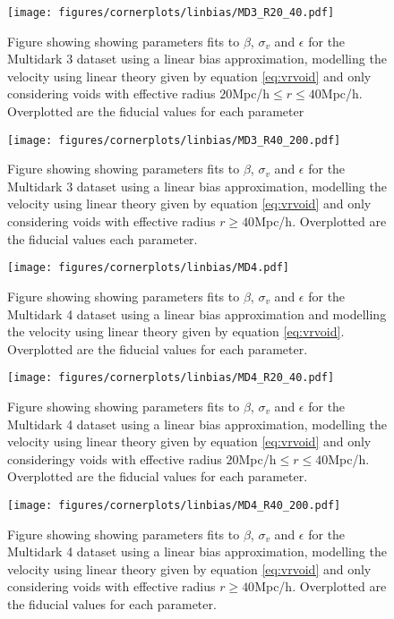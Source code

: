 \begin{figure}[H]
    \texttt{[image: figures/cornerplots/linbias/MD3\_R20\_40.pdf]}
    \caption{Figure showing showing parameters fits to $\beta$, $\sigma_v$ and $\epsilon$ for the Multidark 3 dataset using a linear bias approximation, modelling the velocity using linear theory given by equation \ref{eq:vrvoid} and only considering voids with effective radius $20$Mpc/h$\leq r \leq 40$Mpc/h. Overplotted are the fiducial values for each parameter}
    \label{fig:linbiasMD3R2040}
\end{figure}

\begin{figure}[H]
    \texttt{[image: figures/cornerplots/linbias/MD3\_R40\_200.pdf]}
    \caption{Figure showing showing parameters fits to $\beta$, $\sigma_v$ and $\epsilon$ for the Multidark 3 dataset using a linear bias approximation, modelling the velocity using linear theory given by equation \ref{eq:vrvoid} and only considering voids with effective radius $r\geq 40$Mpc/h. Overplotted are the fiducial values each parameter.}
    \label{fig:linbiasMD3R40}
\end{figure}

\begin{figure}[H]
    \texttt{[image: figures/cornerplots/linbias/MD4.pdf]}
    \caption{Figure showing showing parameters fits to $\beta$, $\sigma_v$ and $\epsilon$ for the Multidark 4 dataset using a linear bias approximation and  modelling the velocity using linear theory given by equation \ref{eq:vrvoid}.
    Overplotted are the fiducial values for each parameter.}
    \label{fig:linbiasMD4}
\end{figure}

\begin{figure}[H]
    \texttt{[image: figures/cornerplots/linbias/MD4\_R20\_40.pdf]}
    \caption{Figure showing showing parameters fits to $\beta$, $\sigma_v$ and $\epsilon$ for the Multidark 4 dataset using a linear bias approximation, modelling the velocity using linear theory given by equation \ref{eq:vrvoid} and only consideringy voids with effective radius $20$Mpc/h$\leq r \leq 40$Mpc/h. Overplotted are the fiducial values for each parameter.}
    \label{fig:linbiasMD4R2040}
\end{figure}

\begin{figure}[H]
    \texttt{[image: figures/cornerplots/linbias/MD4\_R40\_200.pdf]}
    \caption{Figure showing showing parameters fits to $\beta$, $\sigma_v$ and $\epsilon$ for the Multidark 4 dataset using a linear bias approximation, modelling the velocity using linear theory given by equation \ref{eq:vrvoid} and only considering voids with effective radius $r\geq 40$Mpc/h. Overplotted are the fiducial values for each parameter.}
    \label{fig:linbiasMD4R40}
\end{figure}
